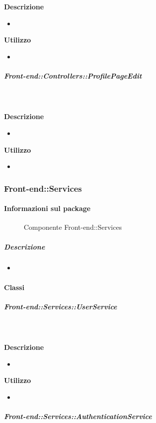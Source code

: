         \textbf{\\ \\ Descrizione} 
          \begin{itemize}
            \item[] 
          \end{itemize}      
        \textbf{Utilizzo}  
          \begin{itemize}
            \item[] 
          \end{itemize}
      \subparagraph{Front-end::Controllers::ProfilePageEdit}
        
        \textbf{\\ \\ Descrizione} 
          \begin{itemize}
            \item[] 
          \end{itemize}      
        \textbf{Utilizzo}  
          \begin{itemize}
            \item[] 
          \end{itemize}
  \subsubsection{Front-end::Services}
  \paragraph{Informazioni sul package} 

    \begin{figure}[H] 
      \begin{center} 
        \caption{Componente Front-end::Services}
      \end{center}  
    \end{figure} 

  \subparagraph{Descrizione} 
    \begin{itemize}
    \item[] 
    \end{itemize} 
    \paragraph{Classi}
      \subparagraph{Front-end::Services::UserService}
        
        \textbf{\\ \\ Descrizione} 
          \begin{itemize}
            \item[] 
          \end{itemize}      
        \textbf{Utilizzo}  
          \begin{itemize}
            \item[] 
          \end{itemize}
      \subparagraph{Front-end::Services::AuthenticationService}
        
